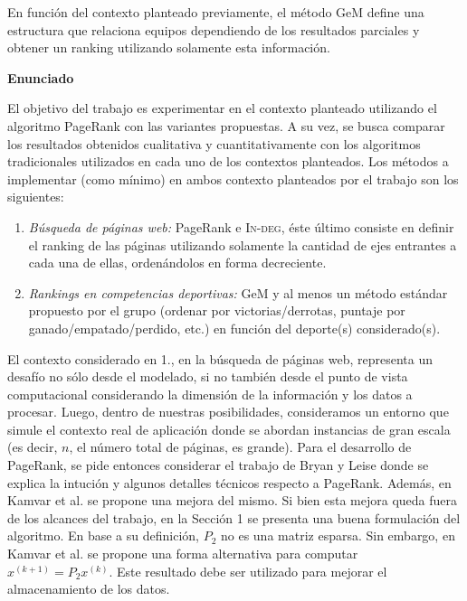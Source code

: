 En funci\'on del contexto planteado previamente, el m\'etodo GeM define una estructura que relaciona equipos dependiendo de los resultados parciales y
obtener un ranking utilizando solamente esta informaci\'on.

\vskip 5pt
\noindent\textbf{Enunciado}
\vskip 5pt

El objetivo del trabajo es experimentar en el contexto planteado utilizando el algoritmo PageRank con las variantes propuestas. A su vez, se busca
comparar los resultados obtenidos cualitativa y cuantitativamente con los algoritmos tradicionales utilizados en cada uno de los contextos planteados. 
Los m\'etodos a implementar (como m\'inimo) en ambos contexto planteados por el trabajo son los siguientes:

\begin{enumerate}
\item \emph{B\'usqueda de p\'aginas web:} PageRank e \textsc{In-deg}, \'este \'ultimo consiste en definir el ranking de las p\'aginas utilizando 
solamente la cantidad de ejes entrantes a cada una de ellas, orden\'andolos en forma decreciente.
\item \emph{Rankings en competencias deportivas:} GeM y al menos un m\'etodo est\'andar propuesto por el grupo (ordenar por victorias/derrotas,
puntaje por ganado/empatado/perdido, etc.) en funci\'on del deporte(s) considerado(s).
\end{enumerate}

El contexto considerado en 1., en la b\'usqueda de p\'aginas web, representa un desaf\'io no s\'olo desde el modelado, si no tambi\'en desde el punto 
de vista computacional considerando la dimensi\'on de la informaci\'on y los datos a procesar. Luego, dentro de nuestras posibilidades, consideramos
un entorno que simule el contexto real de aplicaci\'on donde se abordan  instancias de gran escala (es decir, $n$, el n\'umero total de p\'aginas, es 
grande). Para el desarrollo de PageRank, se pide entonces considerar el trabajo de Bryan y Leise \cite{Bryan2006} donde se explica la intuci\'on y algunos 
detalles t\'ecnicos respecto a PageRank. Adem\'as, en Kamvar et al. \cite{Kamvar2003} se propone una mejora del mismo. Si bien esta mejora queda fuera de 
los alcances del trabajo, en la Secci\'on 1 se presenta una buena formulaci\'on del algoritmo. En base a su definici\'on, $P_2$ no es una matriz esparsa. 
Sin embargo, en Kamvar et al. \cite[Algoritmo 1]{Kamvar2003} se propone una forma alternativa para computar $x^{(k+1)} = P_2 x^{(k)}$. Este resultado debe 
ser utilizado para mejorar el almacenamiento de los datos.

